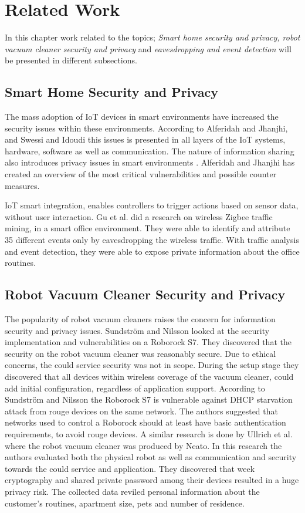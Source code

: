 \chapter{Related Work}
In this chapter work related to the topics; \textit{Smart home security and privacy, robot vacuum cleaner security and privacy} and \textit{eavesdropping and event detection} will be presented in different subsections.


\section{Smart Home Security and Privacy}
The mass adoption of IoT devices in smart environments have increased the security issues within these environments. According to Alferidah and Jhanjhi\cite{Iotissues}, and Swessi and  Idoudi \cite{iotissues1} this issues is presented in all layers of the IoT systems, hardware, software as well as communication. The nature of information sharing also introduces privacy issues in smart environments \cite{Iotissues}. Alferidah and Jhanjhi \cite{Iotissues} has created an overview of the most critical vulnerabilities and possible counter measures. 

IoT smart integration, enables controllers to trigger actions based on sensor data, without user interaction. Gu et al. \cite{eavsIoT} did a research on wireless Zigbee traffic mining, in a smart office environment. They were able to identify and attribute 35 different events only by eavesdropping the wireless traffic. With traffic analysis and event detection, they were able to expose private information about the office routines.  

\section{Robot Vacuum Cleaner Security and Privacy}
The popularity of robot vacuum cleaners raises the concern for information security and privacy issues. Sundström and Nilsson \cite{Roborockvulnerability} looked at the security implementation and vulnerabilities on a Roborock S7. They discovered that the security on the robot vacuum cleaner was reasonably secure. Due to ethical concerns, the could service security was not in scope. During the setup stage they discovered that all devices within wireless coverage of the vacuum cleaner, could add initial configuration, regardless of application support. According to Sundström and Nilsson \cite{Roborockvulnerability} the Roborock S7 is vulnerable against DHCP starvation attack from rouge devices on the same network. The authors suggested that networks used to control a Roborock should at least have basic authentication requirements, to avoid rouge devices. 
A similar research is done by Ullrich et al.\cite{Neato} where the robot vacuum cleaner was produced by Neato. In this research the authors evaluated both the physical robot as well as communication and security towards the could service and application. They discovered that week cryptography and shared private password among their devices resulted in a huge privacy risk. The collected data reviled personal information about the customer's routines, apartment size, pets and number of residence. 

